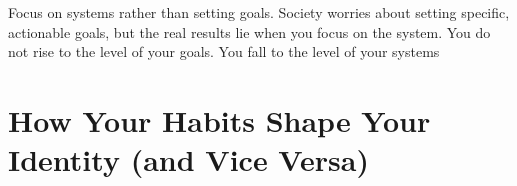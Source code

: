 \documentclass[10pt,twocolumn]{../notes}
\begin{document}
\Advice Focus on systems rather than setting goals.
\Fact Society worries about setting specific, actionable goals, but the real results lie when you focus on the system.
\Quote You do not rise to the level of your goals. You fall to the level of your systems

\section{How Your Habits Shape Your Identity (and Vice Versa)}
\end{document}
